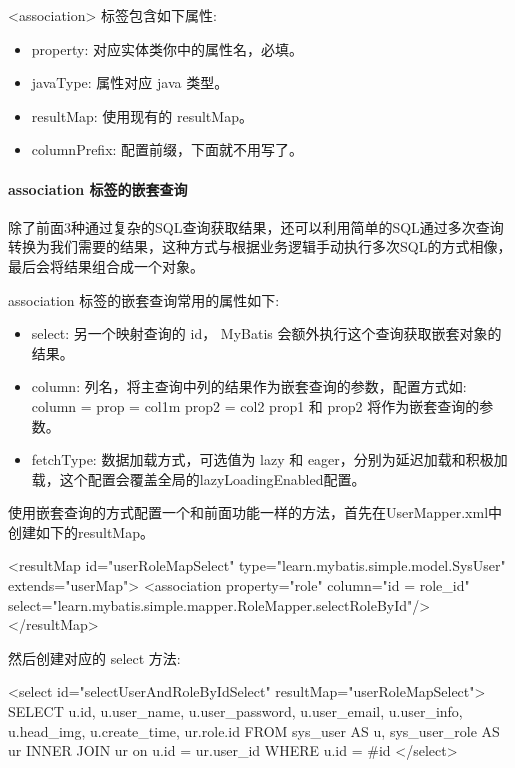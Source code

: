 <association> 标签包含如下属性:
\begin{itemize}
    \item property: 对应实体类你中的属性名，必填。
    \item javaType: 属性对应 java 类型。
    \item resultMap: 使用现有的 resultMap。
    \item columnPrefix: 配置前缀，下面就不用写了。
\end{itemize}

\paragraph*{association 标签的嵌套查询}

除了前面3种通过复杂的SQL查询获取结果，还可以利用简单的SQL通过多次查询转换为我们需要的结果，这种方式与根据业务逻辑手动执行多次SQL的方式相像，最后会将结果组合成一个对象。

association 标签的嵌套查询常用的属性如下:
\begin{itemize}
    \item select: 另一个映射查询的 id， MyBatis 会额外执行这个查询获取嵌套对象的结果。
    \item column: 列名，将主查询中列的结果作为嵌套查询的参数，配置方式如: column = {prop = col1m prop2 = col2} prop1 和 prop2 将作为嵌套查询的参数。
    \item fetchType: 数据加载方式，可选值为 lazy 和 eager，分别为延迟加载和积极加载，这个配置会覆盖全局的lazyLoadingEnabled配置。
\end{itemize}

使用嵌套查询的方式配置一个和前面功能一样的方法，首先在UserMapper.xml中创建如下的resultMap。

\begin{xml}
<resultMap id="userRoleMapSelect" type="learn.mybatis.simple.model.SysUser" extends="userMap">
    <association property="role" column="{id = role_id}" select="learn.mybatis.simple.mapper.RoleMapper.selectRoleById"/>
</resultMap>
\end{xml}

然后创建对应的 select 方法:

\begin{xml}
<select id="selectUserAndRoleByIdSelect" resultMap="userRoleMapSelect">
    SELECT u.id,
           u.user_name,
           u.user_password,
           u.user_email,
           u.user_info,
           u.head_img,
           u.create_time,
           ur.role.id
    FROM sys_user AS u,
         sys_user_role AS ur
             INNER JOIN ur on u.id = ur.user_id
    WHERE u.id = #{id}
</select>
\end{xml}

